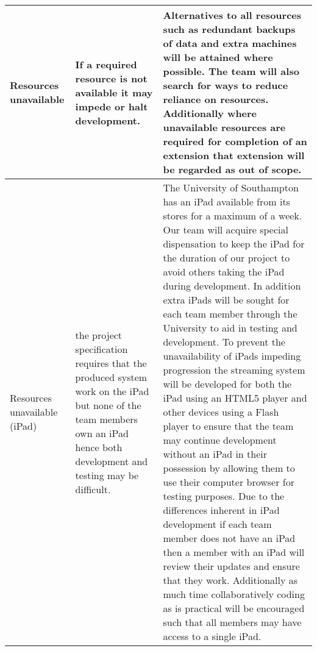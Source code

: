 \begin{center}
\begin{landscape}
\begin{longtable}{>{\raggedright}p{3cm}  >{\raggedright}p{7cm}  p{12cm}}
        Resources unavailable                            & If a required resource is not available it may impede or halt development.                                                                                                                                                                                                                                                                                                   & Alternatives to all resources such as redundant backups of data and extra machines will be attained where possible. The team will also search for ways to reduce reliance on resources. Additionally where unavailable resources are required for completion of an extension that extension will be regarded as out of scope.                                                                                                                                                                                                                                                                                                                                                                                                                                                                                                                                                                                                                                                                                                            \\ \midrule
        Resources unavailable (iPad)                     & the project specification requires that the produced system work on the iPad but none of the team members own an iPad hence both development and testing may be difficult.                                                                                                                                                                                                   & The University of Southampton has an iPad available from its stores for a maximum of a week. Our team will acquire special dispensation to keep the iPad for the duration of our project to avoid others taking the iPad during development. In addition extra iPads will be sought for each team member through the University to aid in testing and development. To prevent the unavailability of iPads impeding progression the streaming system will be developed for both the iPad using an HTML5 player and other devices using a Flash player to ensure that the team may continue development without an iPad in their possession by allowing them to use their computer browser for testing purposes. Due to the differences inherent in iPad development if each team member does not have an iPad then a member with an iPad will review their updates and ensure that they work. Additionally as much time collaboratively coding as is practical will be encouraged such that all members may have access to a single iPad. \\ \midrule

\end{longtable}
\end{landscape}
\end{center}
